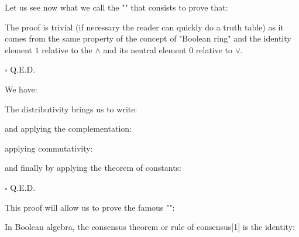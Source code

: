 	\begin{theorem}
	Let us see now what we call the "" that consists to prove that:
	
	\end{theorem}
	\begin{dem}
	The proof is trivial (if necessary the reader can quickly do a truth table) as it comes from the same property of the concept of "Boolean ring" and the identity element $1$ relative to the $\wedge$ and its neutral element $0$ relative to $\vee$.
	\begin{flushright}
		$\square$  Q.E.D.
	\end{flushright}
	\end{dem}
	\begin{theorem}
	We have:
	
	\end{theorem}
	\begin{dem}
	The distributivity brings us to write:
	
	and applying the complementation:
	
	applying commutativity:
	
	and finally by applying the theorem of constants:
	
	\begin{flushright}
		$\square$  Q.E.D.
	\end{flushright}
	\end{dem}
	This proof will allow us to prove  the famous "":
	\begin{theorem}
	In Boolean algebra, the consensus theorem or rule of consensus[1] is the identity:
	
	\end{theorem}
